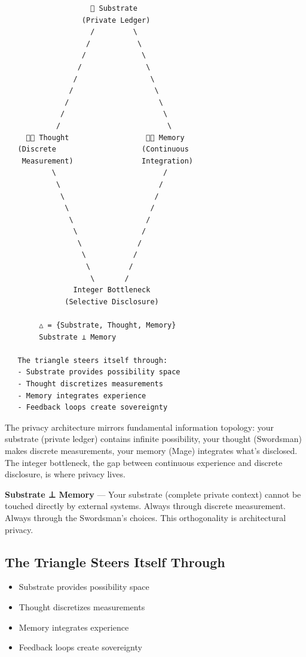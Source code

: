 \documentclass[
]{article}
\begin{document}
\begin{verbatim}
                    🌳 Substrate
                  (Private Ledger)
                    /         \
                   /           \
                  /             \
                 /               \
                /                 \
               /                   \
              /                     \
             /                       \
            /                         \
     🦅💭 Thought                  🦅🧠 Memory
   (Discrete                    (Continuous
    Measurement)                Integration)
           \                         /
            \                       /
             \                     /
              \                   /
               \                 /
                \               /
                 \             /
                  \           /
                   \         /
                    \       /
                Integer Bottleneck
              (Selective Disclosure)

        △ = {Substrate, Thought, Memory}
        Substrate ⊥ Memory

   The triangle steers itself through:
   - Substrate provides possibility space
   - Thought discretizes measurements
   - Memory integrates experience
   - Feedback loops create sovereignty
\end{verbatim}

The privacy architecture mirrors fundamental information topology: your
substrate (private ledger) contains infinite possibility, your thought
(Swordsman) makes discrete measurements, your memory (Mage) integrates
what's disclosed. The integer bottleneck, the gap between continuous
experience and discrete disclosure, is where privacy lives.

\textbf{Substrate ⊥ Memory} --- Your substrate (complete private
context) cannot be touched directly by external systems. Always through
discrete measurement. Always through the Swordsman's choices. This
orthogonality is architectural privacy.

\subsection{The Triangle Steers Itself
Through}\label{the-triangle-steers-itself-through}

\begin{itemize}
\item
  Substrate provides possibility space
\item
  Thought discretizes measurements
\item
  Memory integrates experience
\item
  Feedback loops create sovereignty
\end{itemize}
\end{document}
